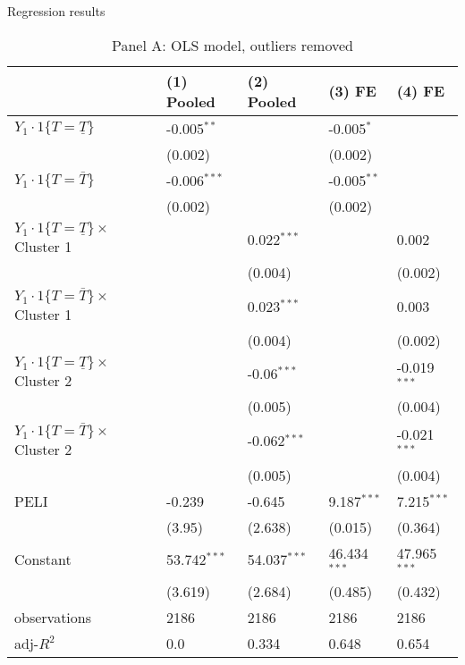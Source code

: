 \documentclass[12pt]{article}
\begin{document}
\begin{table}
    \captionsetup[sub]{singlelinecheck=false}
    \caption{Regression results}
    \vspace*{12pt}
    
    \begin{subtable}{\textwidth}
        \centering
        \captionsetup{justification=centering}
        \caption*{Panel A: OLS model, outliers removed}
        \begin{tabular}{lllll}
\hline
 & (1) Pooled & (2) Pooled & (3) FE & (4) FE \\
\hline
$Y_1\cdot\text{1}\{T=\underline{T}\}$ & -0.005$^{**}$ &  & -0.005$^{*}$ &  \\
 & (0.002) &  & (0.002) &  \\
$Y_1\cdot\text{1}\{T=\bar{T}\}$ & -0.006$^{***}$ &  & -0.005$^{**}$ &  \\
 & (0.002) &  & (0.002) &  \\
$Y_1\cdot\text{1}\{T=\underline{T}\}\times$ Cluster 1 &  & 0.022$^{***}$ &  & 0.002 \\
 &  & (0.004) &  & (0.002) \\
$Y_1\cdot\text{1}\{T=\bar{T}\}\times$ Cluster 1 &  & 0.023$^{***}$ &  & 0.003 \\
 &  & (0.004) &  & (0.002) \\
$Y_1\cdot\text{1}\{T=\underline{T}\}\times$ Cluster 2 &  & -0.06$^{***}$ &  & -0.019$^{***}$ \\
 &  & (0.005) &  & (0.004) \\
$Y_1\cdot\text{1}\{T=\bar{T}\}\times$ Cluster 2 &  & -0.062$^{***}$ &  & -0.021$^{***}$ \\
 &  & (0.005) &  & (0.004) \\
PELI & -0.239 & -0.645 & 9.187$^{***}$ & 7.215$^{***}$ \\
 & (3.95) & (2.638) & (0.015) & (0.364) \\
Constant & 53.742$^{***}$ & 54.037$^{***}$ & 46.434$^{***}$ & 47.965$^{***}$ \\
 & (3.619) & (2.684) & (0.485) & (0.432) \\\hline

observations & 2186 & 2186 & 2186 & 2186 \\
adj-$R^2$ & 0.0 & 0.334 & 0.648 & 0.654 \\
\hline
\end{tabular}
    \end{subtable}
    
    \vspace*{12pt}


\end{table}
\end{document}
